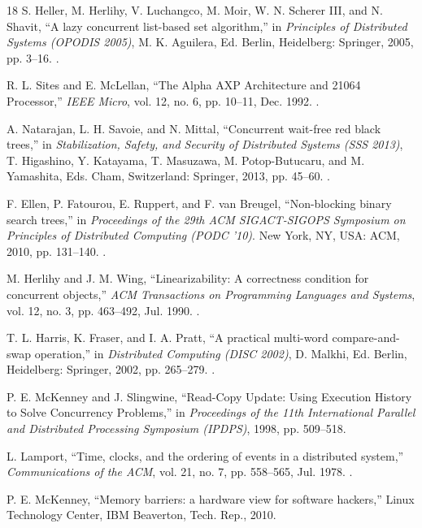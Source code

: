 \begin{thebibliography}{18}
S. Heller, M. Herlihy, V. Luchangco, M. Moir, W. N. Scherer III, and N. Shavit, ``A lazy concurrent list-based set algorithm,'' in \textit{Principles of Distributed Systems (OPODIS 2005)}, M. K. Aguilera, Ed. Berlin, Heidelberg: Springer, 2005, pp. 3--16. .

R. L. Sites and E. McLellan, ``The Alpha AXP Architecture and 21064 Processor,'' \textit{IEEE Micro}, vol. 12, no. 6, pp. 10--11, Dec. 1992. .

A. Natarajan, L. H. Savoie, and N. Mittal, ``Concurrent wait-free red black trees,'' in \textit{Stabilization, Safety, and Security of Distributed Systems (SSS 2013)}, T. Higashino, Y. Katayama, T. Masuzawa, M. Potop-Butucaru, and M. Yamashita, Eds. Cham, Switzerland: Springer, 2013, pp. 45--60. .

F. Ellen, P. Fatourou, E. Ruppert, and F. van Breugel, ``Non-blocking binary search trees,'' in \textit{Proceedings of the 29th ACM SIGACT-SIGOPS Symposium on Principles of Distributed Computing (PODC '10)}. New York, NY, USA: ACM, 2010, pp. 131--140. .

M. Herlihy and J. M. Wing, ``Linearizability: A correctness condition for concurrent objects,'' \textit{ACM Transactions on Programming Languages and Systems}, vol. 12, no. 3, pp. 463--492, Jul. 1990. .

T. L. Harris, K. Fraser, and I. A. Pratt, ``A practical multi-word compare-and-swap operation,'' in \textit{Distributed Computing (DISC 2002)}, D. Malkhi, Ed. Berlin, Heidelberg: Springer, 2002, pp. 265--279. .

P. E. McKenney and J. Slingwine, ``Read-Copy Update: Using Execution History to Solve Concurrency Problems,'' in \textit{Proceedings of the 11th International Parallel and Distributed Processing Symposium (IPDPS)}, 1998, pp. 509--518.

L. Lamport, ``Time, clocks, and the ordering of events in a distributed system,'' \textit{Communications of the ACM}, vol. 21, no. 7, pp. 558--565, Jul. 1978. .

P. E. McKenney, ``Memory barriers: a hardware view for software hackers,'' Linux Technology Center, IBM Beaverton, Tech. Rep., 2010.

\end{thebibliography}
